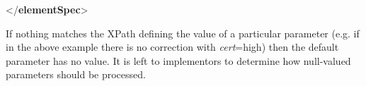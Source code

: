 \begin{shaded}
\hspace*{1em}\mbox{}\newline 
\hspace*{1em}\hspace*{1em}\mbox{}\newline 
\hspace*{1em}\hspace*{1em}\mbox{}\newline 
\hspace*{1em}\mbox{}\newline 
{}\mbox{}\newline 
{</\textbf{elementSpec}>}\end{shaded}\egroup\par \par
If nothing matches the XPath defining the value of a particular parameter (e.g. if in the above example there is no correction with {\itshape cert}=high) then the \textsf{default} parameter has no value. It is left to implementors to determine how null-valued parameters should be processed.

